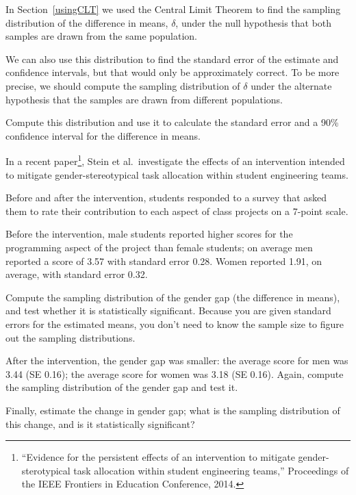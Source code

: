 \documentclass[12pt]{book}
\begin{document}
\begin{exercise}
In Section~\ref{usingCLT} we used the Central Limit Theorem to find
the sampling distribution of the difference in means, $\delta$, under
the null hypothesis that both samples are drawn from the same
population.

We can also use this distribution to find the standard error of the
estimate and confidence intervals, but that would only be
approximately correct.  To be more precise, we should compute the
sampling distribution of $\delta$ under the alternate hypothesis that
the samples are drawn from different populations.

Compute this distribution and use it to calculate the standard error
and a 90\% confidence interval for the difference in means.
\end{exercise}


\begin{exercise}
In a recent paper\footnote{``Evidence for the persistent effects of an
  intervention to mitigate gender-sterotypical task allocation within
  student engineering teams,'' Proceedings of the IEEE Frontiers in Education
Conference, 2014.}, Stein et al.~investigate the
effects of an intervention intended to mitigate gender-stereotypical
task allocation within student engineering teams.

Before and after the intervention, students responded to a survey that
asked them to rate their contribution to each aspect of class projects on
a 7-point scale.

Before the intervention, male students reported higher scores for the
programming aspect of the project than female students; on average men
reported a score of 3.57 with standard error 0.28.  Women reported
1.91, on average, with standard error 0.32.

Compute the sampling distribution of the gender gap (the difference in
means), and test whether it is statistically significant.  Because you
are given standard errors for the estimated means, you don't need to
know the sample size to figure out the sampling distributions.
   

After the intervention, the gender gap was smaller: the average score
for men was 3.44 (SE 0.16); the average score for women was 3.18 (SE
0.16).  Again, compute the sampling distribution of the gender gap and
test it.

Finally, estimate the change in gender gap; what is the sampling
distribution of this change, and is it statistically significant?
   
\end{exercise}


\printindex

\clearemptydoublepage
\end{document}
